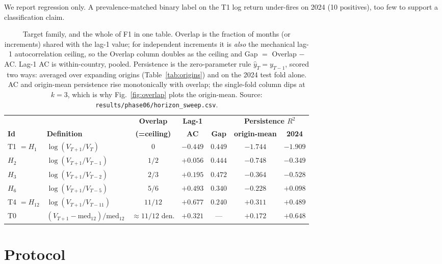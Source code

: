 \documentclass[10pt]{article}
\begin{document}
We report regression only. A prevalence-matched binary label on the T1 log return under-fires on 2024 (10 positives), too few to support a classification claim.

\begin{table}[t]
\centering
\caption{Target family, and the whole of F1 in one table. Overlap is the fraction of months (or increments) shared with the lag-1 value; for independent increments it is \emph{also} the mechanical lag-1 autocorrelation ceiling, so the Overlap column doubles as the ceiling and Gap $=$ Overlap $-$ AC. Lag-1 AC is within-country, pooled. Persistence is the zero-parameter rule $\hat{y}_T=y_{T-1}$, scored two ways: averaged over expanding origins (Table~\ref{tab:origins}) and on the 2024 test fold alone. AC and origin-mean persistence rise monotonically with overlap; the single-fold column dips at $k=3$, which is why Fig.~\ref{fig:overlap} plots the origin-mean. Source: \texttt{results/phase06/horizon\_sweep.csv}.}
\label{tab:targets}
\footnotesize
\begin{tabular}{l l c c c c c}
\toprule
& & \textbf{Overlap} & \textbf{Lag-1} & & \multicolumn{2}{c}{\textbf{Persistence $R^2$}} \\
\cmidrule(l){6-7}
\textbf{Id} & \textbf{Definition} & \textbf{(=ceiling)} & \textbf{AC} & \textbf{Gap} & \textbf{origin-mean} & \textbf{2024} \\
\midrule
T1 $=H_1$ & $\log(V_{T+1}/V_T)$ & $0$ & $-0.449$ & $0.449$ & $-1.744$ & $-1.909$ \\
$H_2$ & $\log(V_{T+1}/V_{T-1})$ & $1/2$ & $+0.056$ & $0.444$ & $-0.748$ & $-0.349$ \\
$H_3$ & $\log(V_{T+1}/V_{T-2})$ & $2/3$ & $+0.195$ & $0.472$ & $-0.364$ & $-0.528$ \\
$H_6$ & $\log(V_{T+1}/V_{T-5})$ & $5/6$ & $+0.493$ & $0.340$ & $-0.228$ & $+0.098$ \\
T4 $=H_{12}$ & $\log(V_{T+1}/V_{T-11})$ & $11/12$ & $+0.677$ & $0.240$ & $+0.311$ & $+0.489$ \\
T0 & $(V_{T+1}-\mathrm{med}_{12})/\mathrm{med}_{12}$ & $\approx 11/12$ den. & $+0.321$ & --- & $+0.172$ & $+0.648$ \\
\bottomrule
\end{tabular}
\end{table}

\section{Protocol}
\label{sec:protocol}
\end{document}
